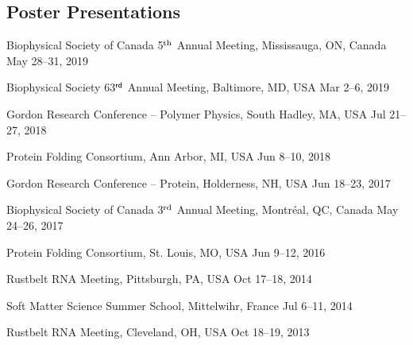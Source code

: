 \documentclass[11pt]{../yhlcv}
\begin{document}
\subsection*{Poster Presentations}
\begin{etaremune}[leftmargin=0.26in]

\item Biophysical Society of Canada 5$^{\rm th}$ Annual Meeting, Mississauga, ON, Canada \hfill {May 28--31, 2019}

\item Biophysical Society 63$^{\sf rd}$  Annual Meeting, Baltimore, MD, USA \hfill {Mar 2--6, 2019}

\item Gordon Research Conference -- Polymer Physics, South Hadley, MA, USA \hfill {Jul 21--27, 2018}

\item Protein Folding Consortium, Ann Arbor, MI, USA \hfill 	{Jun 8--10, 2018}

\item Gordon Research Conference -- Protein, Holderness, NH, USA \hfill 	{Jun 18--23, 2017}

\item Biophysical Society of Canada 3$^{\rm rd}$ Annual Meeting, Montr\'{e}al, QC, Canada \hfill {May 24--26, 2017}

\item Protein Folding Consortium, St. Louis, MO, USA \hfill {Jun 9--12, 2016}

\item Rustbelt RNA Meeting, Pittsburgh, PA, USA \hfill {Oct 17--18, 2014}

\item Soft Matter Science Summer School, Mittelwihr, France \hfill {Jul 6--11, 2014}

\item Rustbelt RNA Meeting, Cleveland, OH, USA \hfill {Oct 18--19, 2013}

\end{etaremune}
\end{document}
